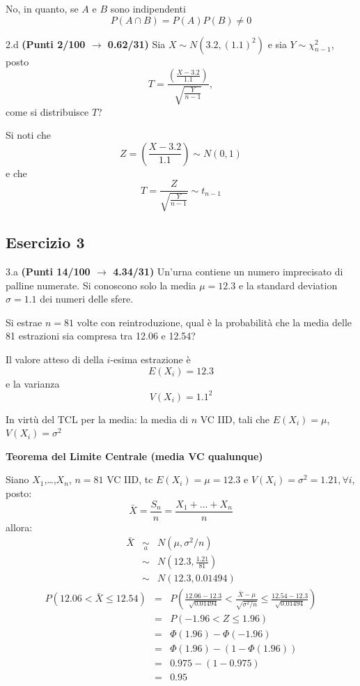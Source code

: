 \documentclass[
  11pt,
]{book}
\theoremstyle{mytheoremstyle}
\theoremstyle{mydefstyle}
\newenvironment{sol}
  {
  \begin{tcolorbox}[enhanced,breakable,arc=0.1mm,boxrule=1pt,colback=white,colframe=iblue,
  title=\bf \fontfamily{lmss}\selectfont \hspace{.5 cm} Soluzione,drop fuzzy shadow]

}{
\end{tcolorbox}
  }
\begin{document}
\begin{sol}
No, in quanto, se \(A\) e \(B\) sono indipendenti
\[P(A\cap B)=P(A)P(B)\neq0\]

\end{sol}

2.d \textbf{(Punti 2/100 \(\rightarrow\) 0.62/31)} Sia \(X\sim N(3.2,(1.1)^2)\) e sia \(Y\sim\chi_{n-1}^2\), posto
\[
T=\frac{\left(\frac{X-3.2}{1.1}\right)}{\sqrt{\frac{Y}{n-1}}},
\]
come si distribuisce \(T\)?

\begin{sol}
Si noti che
\[
Z=\left(\frac{X-3.2}{1.1}\right)\sim N(0,1)
\]
e che
\[
T=\frac{Z}{\sqrt{\frac{Y}{n-1}}}\sim t_{n-1}
\]

\end{sol}

\subsection{Esercizio 3}\label{esercizio-3-5}

3.a \textbf{(Punti 14/100 \(\rightarrow\) 4.34/31)} Un'urna contiene un numero imprecisato di palline numerate. Si conoscono solo
la media \(\mu=12.3\) e la standard deviation \(\sigma=1.1\) dei numeri delle sfere.

Si estrae \(n=81\) volte con reintroduzione, qual è la probabilità che la media delle 81 estrazioni sia compresa tra
12.06 e 12.54?

\begin{sol}
Il valore atteso di della \(i\)-esima estrazione è
\[
E(X_i)=12.3
\]
e la varianza
\[
V(X_i)=1.1^2
\]

In virtù del TCL per la media: la media di \(n\) VC IID, tali che
\(E(X_i)=\mu\), \(V(X_i)=\sigma^2\)

\textbf{Teorema del Limite Centrale (media VC qualunque)}

Siano \(X_1\),\ldots,\(X_n\), \(n=81\) VC IID, tc \(E(X_i)=\mu=12.3\) e \(V(X_i)=\sigma^2=1.21,\forall i\), posto:
\[
      \bar X=\frac{S_n}n =\frac{X_1 + ... + X_n}n
      \]
allora:\begin{eqnarray*}
  \bar X & \mathop{\sim}\limits_{a}& N(\mu,\sigma^2/n) \\
     &\sim & N\left(12.3,\frac{1.21}{81}\right) \\
     &\sim & N(12.3,0.01494)
  \end{eqnarray*}\begin{eqnarray*}
   P( 12.06 < \bar X \leq  12.54 ) &=& P\left( \frac { 12.06  -  12.3 }{\sqrt{ 0.01494 }} < \frac { \bar X  -  \mu }{ \sqrt{\sigma^2/n} } \leq \frac { 12.54  -  12.3 }{\sqrt{ 0.01494 }}\right)  \\
              &=& P\left(  -1.96  < Z \leq  1.96 \right) \\
              &=& \Phi( 1.96 )-\Phi( -1.96 )\\
              &=&  \Phi( 1.96 )-(1-\Phi( 1.96 )) \\ &=&  0.975 -(1- 0.975 ) \\ 
              &=&  0.95 
   \end{eqnarray*}

\end{sol}
\end{document}
